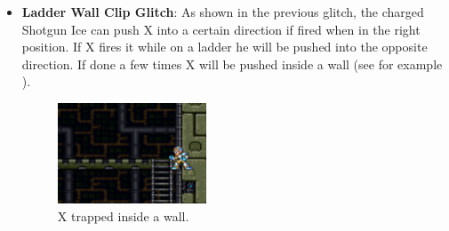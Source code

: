 \begin{itemize}
	\item \textbf{Ladder Wall Clip Glitch}: As shown in the previous glitch, the charged Shotgun Ice can push X into a certain direction if fired when in the right position. If X fires it while on a ladder he will be pushed into the opposite direction. If done a few times X will be pushed inside a wall (see for example ).
	\begin{figure}[htp]
		\centering
		\includegraphics[height=3cm]{figures/X1/Miscs/Wall_clipping.jpg}
		\caption{X trapped inside a wall.}
	\end{figure}
	

\end{itemize}
